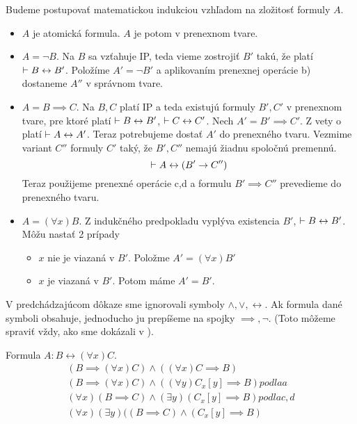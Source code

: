 \begin{dokaz}
Budeme postupovať matematickou indukciou vzhľadom na zložitosť formuly $A$.
\begin{itemize}
    \item $A$ je atomická formula. $A$ je potom v prenexnom tvare.
    \item $A=\neg B$. Na $B$ sa vzťahuje IP, teda vieme zostrojiť
        $B'$ takú, že platí
        $\vdash B \leftrightarrow B'$.
        Položíme $A'=\neg B'$ a aplikovaním prenexnej operácie b) dostaneme 
        $A''$ v správnom tvare.
    \item $A=B \implies C$. Na $B,C$ platí IP a teda existujú formuly
        $B',C'$ v prenexnom tvare, pre ktoré platí
        $\vdash B \leftrightarrow B'$, $\vdash C \leftrightarrow C'$.
        Nech $A' = B' \implies C'$. Z vety o  platí
        $\vdash A \leftrightarrow A'$. Teraz potrebujeme dostať
        $A'$ do prenexného tvaru.
        Vezmime variant $C''$ formuly $C'$ taký, že $B',C''$ nemajú
        žiadnu spoločnú premennú.
        \begin{equation}
            \vdash A \leftrightarrow (B' \rightarrow C'')
        \end{equation}
        Teraz použijeme prenexné operácie c,d a formulu
        $B' \implies C''$ prevedieme do prenexného tvaru.
    \item $A=(\forall x)B$. Z indukčného predpokladu vyplýva
        existencia $B'$, $\vdash B \leftrightarrow B'$.
        Môžu nastať 2 prípady
        \begin{itemize}
        \item $x$ nie je viazaná v $B'$. Položme $A' = (\forall x) B'$
        \item $x$ je viazaná v $B'$. Potom máme $A' = B'$.
        \end{itemize}
\end{itemize}
\end{dokaz}
\begin{poznamka}
    V predchádzajúcom dôkaze sme ignorovali symboly
    $\land,\lor,\leftrightarrow$. Ak formula dané symboli obsahuje,
    jednoducho ju prepíšeme na spojky $\implies, \neg$. (Toto môžeme
    spraviť vždy, ako sme dokázali v ).
\end{poznamka}

\begin{priklad}
    Formula $A: B \leftrightarrow (\forall x) C$.
    \begin{align}
   (B \implies (\forall x) C) \land ((\forall x) C \implies B) \\
   (B \implies (\forall x) C) \land ((\forall y) C_x[y] \implies B) 
    podla a
   \\
   (\forall x)(B \implies C) \land (\exists y) (C_x[y] \implies B) 
   podla c,d
   \\
   (\forall x)(\exists y)((B \implies C) \land (C_x[y] \implies B)
    \end{align}
\end{priklad}

